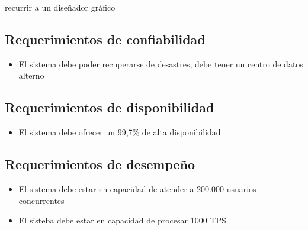 \documentclass[letterpaper,10pt,spanish]{sphinxmanual}
\begin{document}
\sphinxAtStartPar
recurrir a un diseñador gráfico


\subsection{Requerimientos de confiabilidad}
\label{\detokenize{SRS:requerimientos-de-confiabilidad}}\begin{itemize}
\item {} 
\sphinxAtStartPar
El sistema debe poder recuperarse de desastres, debe tener un centro de datos alterno

\end{itemize}


\subsection{Requerimientos de disponibilidad}
\label{\detokenize{SRS:requerimientos-de-disponibilidad}}\begin{itemize}
\item {} 
\sphinxAtStartPar
El sistema debe ofrecer un 99,7\% de alta disponibilidad

\end{itemize}


\subsection{Requerimientos de desempeño}
\label{\detokenize{SRS:requerimientos-de-desempeno}}\begin{itemize}
\item {} 
\sphinxAtStartPar
El sistema debe estar en capacidad de atender a 200.000 usuarios concurrentes

\item {} 
\sphinxAtStartPar
El sisteba debe estar en capacidad de  procesar 1000 TPS

\end{itemize}
\end{document}
